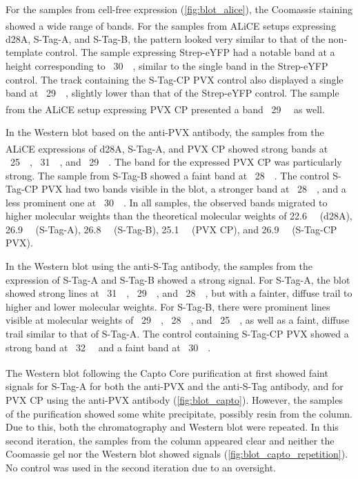 For the samples from cell-free expression (\autoref{fig:blot_alice}), the Coomassie staining showed a wide range of bands. For the samples from ALiCE\textsuperscript{\textregistered} setups expressing d28A, S-Tag-A, and S-Tag-B, the pattern looked very similar to that of the non-template control. The sample expressing Strep-eYFP had a notable band at a height corresponding to ~\SI{30}{\kilo\Dalton}, similar to the single band in the Strep-eYFP control. The track containing the S-Tag-CP PVX control also displayed a single band at ~\SI{29}{\kilo\Dalton}, slightly lower than that of the Strep-eYFP control. The sample from the ALiCE\textsuperscript{\textregistered} setup expressing PVX CP presented a band ~\SI{29}{\kilo\Dalton} as well. 

In the Western blot based on the anti-PVX antibody, the samples from the ALiCE\textsuperscript{\textregistered} expressions of d28A, S-Tag-A, and PVX CP showed strong bands at ~\SI{25}{\kilo\Dalton}, ~\SI{31}{\kilo\Dalton}, and ~\SI{29}{\kilo\Dalton}. The band for the expressed PVX CP was particularly strong. The sample from S-Tag-B showed a faint band at ~\SI{28}{\kilo\Dalton}. The control S-Tag-CP PVX had two bands visible in the blot, a stronger band at ~\SI{28}{\kilo\Dalton}, and a less prominent one at ~\SI{30}{\kilo\Dalton}. In all samples, the observed bands migrated to higher molecular weights than the theoretical molecular weights of \SI{22.6}{\kilo\Dalton} (d28A), \SI{26.9}{\kilo\Dalton} (S-Tag-A), \SI{26.8}{\kilo\Dalton} (S-Tag-B), \SI{25.1}{\kilo\Dalton} (PVX CP), and \SI{26.9}{\kilo\Dalton} (S-Tag-CP PVX).

In the Western blot using the anti-S-Tag antibody, the samples from the expression of S-Tag-A and S-Tag-B showed a strong signal. For S-Tag-A, the blot showed strong lines at ~\SI{31}{\kilo\Dalton}, ~\SI{29}{\kilo\Dalton}, and ~\SI{28}{\kilo\Dalton}, but with a fainter, diffuse trail to higher and lower molecular weights. For S-Tag-B, there were prominent lines visible at molecular weights of ~\SI{29}{\kilo\Dalton}, ~\SI{28}{\kilo\Dalton}, and ~\SI{25}{\kilo\Dalton}, as well as a faint, diffuse trail similar to that of S-Tag-A. The control containing S-Tag-CP PVX showed a strong band at ~\SI{32}{\kilo\Dalton} and a faint band at ~\SI{30}{\kilo\Dalton}.

The Western blot following the Capto\textsuperscript{\texttrademark} Core purification at first showed faint signals for S-Tag-A for both the anti-PVX and the anti-S-Tag antibody, and for PVX CP using the anti-PVX antibody (\autoref{fig:blot_capto}). However, the samples of the purification showed some white precipitate, possibly resin from the column. Due to this, both the chromatography and Western blot were repeated. In this second iteration, the samples from the column appeared clear and neither the Coomassie gel nor the Western blot showed signals (\autoref{fig:blot_capto_repetition}). No control was used in the second iteration due to an oversight.


